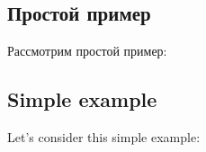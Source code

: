 \ifdefined\RUSSIAN
\subsection{Простой пример}

Рассмотрим простой пример:
\fi

\ifdefined\ENGLISH
\subsection{Simple example}

Let's consider this simple example:
\fi

\ifdefined\GERMAN
\subsection{\DEph{}}

\DEph{}

\fi






\EN{}
\RU{}
\DE{}

